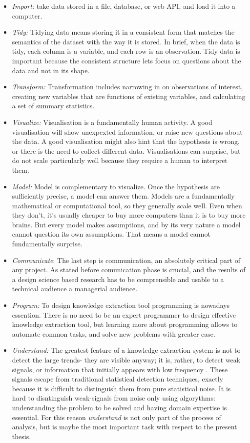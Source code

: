 \documentclass[]{book}
\begin{document}
\begin{itemize}
\item
  \emph{Import:} take data stored in a file, database, or web API, and
  load it into a computer.
\item
  \emph{Tidy:} Tidying data means storing it in a consistent form that
  matches the semantics of the dataset with the way it is stored. In
  brief, when the data is tidy, each column is a variable, and each row
  is an observation. Tidy data is important because the consistent
  structure lets focus on questions about the data and not in its shape.
\item
  \emph{Transform:} Transformation includes narrowing in on observations
  of interest, creating new variables that are functions of existing
  variables, and calculating a set of summary statistics.
\item
  \emph{Visualize:} Visualisation is a fundamentally human activity. A
  good visualisation will show unexpexted information, or raise new
  questions about the data. A good visualisation might also hint that
  the hypothesis is wrong, or there is the need to collect different
  data. Visualisations can surprise, but do not scale particularly well
  because they require a human to interpret them.
\item
  \emph{Model:} Model is complementary to visualize. Once the hypothesis
  are sufficiently precise, a model can answer them. Models are a
  fundamentally mathematical or computational tool, so they generally
  scale well. Even when they don't, it's usually cheaper to buy more
  computers than it is to buy more brains. But every model makes
  assumptions, and by its very nature a model cannot question its own
  assumptions. That means a model cannot fundamentally surprise.
\item
  \emph{Communicate}: The last step is communication, an absolutely
  critical part of any project. As stated before comunication phase is
  crucial, and the results of a design science based research has to be
  comprensible and usable to a technical audience a managerial audience.
\item
  \emph{Program:} To design knowledge extraction tool programming is
  nowadays essention. There is no need to be an expert programmer to
  design effective knowledge extraction tool, but learning more about
  programming allows to automate common tasks, and solve new problems
  with greater ease.
\item
  \emph{Understand:} The greatest feature of a knowledge extraction
  system is not to detect the large trends- they are visible anyway; it
  is, rather, to detect weak signals, or information that initially
  appears with low frequency \citep{apreda2016functional}. These signals
  escape from traditional statistical detection techniques, exactly
  because it is difficult to distinguish them from pure statistical
  noise. It is hard to disntinguish weak-signals from noise only using
  algorythms: understanding the problem to be solved and having domain
  expertise is essential. For this reason \emph{understand} is not only
  part of the process of analysis, but is maybe the most important task
  with respect to the present thesis.
\end{itemize}
\end{document}
